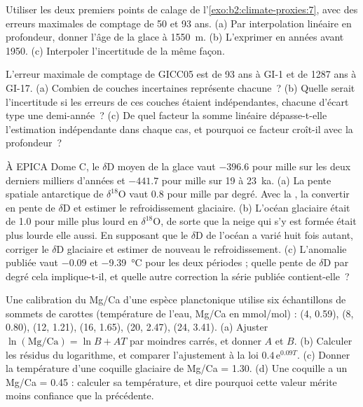 \begin{exercise}[$\star\star$]\label{exo:b2:climate-proxies:8}
Utiliser les deux premiers points de calage de l'\cref{exo:b2:climate-proxies:7}, avec des erreurs maximales de comptage de 50
et 93 ans. (a) Par interpolation linéaire en profondeur, donner l'âge de la glace à \qty{1550}{m}.
(b) L'exprimer en années avant 1950. (c) Interpoler l'incertitude de la même façon.
\end{exercise}

\begin{exercise}[$\star\star$]\label{exo:b2:climate-proxies:9}
L'erreur maximale de comptage de GICC05 est de 93 ans à GI-1 et de \num{1287} ans à GI-17. (a) Combien de
couches incertaines représente chacune~? (b) Quelle serait l'incertitude si les erreurs de ces couches étaient
indépendantes, chacune d'écart type une demi-année~? (c) De quel facteur la somme linéaire dépasse-t-elle l'estimation
indépendante dans chaque cas, et pourquoi ce facteur croît-il avec la profondeur~?
\end{exercise}

\begin{exercise}[$\star\star\star$]\label{exo:b2:climate-proxies:10}
À EPICA Dome C, le $\delta$D moyen de la glace vaut $-396.6$ pour mille sur les deux derniers milliers d'années
et $-441.7$ pour mille sur 19 à \qty{23}{ka}. (a) La pente spatiale antarctique de $\delta^{18}$O vaut
\num{0.8} pour mille par degré. Avec la , la convertir en pente de $\delta$D et
estimer le refroidissement glaciaire. (b) L'océan glaciaire était de \num{1.0} pour mille plus lourd en
$\delta^{18}$O, de sorte que la neige qui s'y est formée était plus lourde elle aussi. En supposant que le $\delta$D de l'océan
a varié huit fois autant, corriger le $\delta$D glaciaire et estimer de nouveau le refroidissement.
(c) L'anomalie publiée vaut $-0.09$ et \qty{-9.39}{\celsius} pour les deux périodes ; quelle pente de
$\delta$D par degré cela implique-t-il, et quelle autre correction la série publiée contient-elle~?
\end{exercise}

\begin{exercise}[$\star\star\star$]\label{exo:b2:climate-proxies:11}
Une calibration du Mg/Ca d'une espèce planctonique utilise six échantillons de sommets de carottes (température de l'eau,
Mg/Ca en \unit{mmol/mol}) : (4, 0.59), (8, 0.80), (12, 1.21), (16, 1.65), (20, 2.47), (24, 3.41).
(a) Ajuster $\ln(\text{Mg/Ca}) = \ln B + AT$ par moindres carrés, et donner $A$ et $B$. (b) Calculer les
résidus du logarithme, et comparer l'ajustement à la loi $0.4\,\mathrm{e}^{0.09T}$. (c) Donner la
température d'une coquille glaciaire de Mg/Ca = 1.30. (d) Une coquille a un Mg/Ca = 0.45 : calculer sa
température, et dire pourquoi cette valeur mérite moins confiance que la précédente.
\end{exercise}

